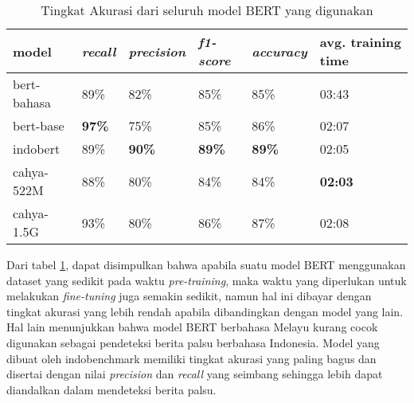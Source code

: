 \begin{table}[h]
    \centering
    \caption{Tingkat Akurasi dari seluruh model BERT yang digunakan}
    \label{tab:model_bert_result}
    \begin{tabular}{|l|l|l|l|l|p{.12\linewidth}|}
        \hline
        \textbf{model} & \textit{\textbf{recall}} & \textit{\textbf{precision}} & \textit{\textbf{f1-score}} & \textit{\textbf{accuracy}} & \textbf{avg. training time} \\ \hline
        bert-bahasa    & 89\%                     & 82\%                        & 85\%                       & 85\%                       & 03:43                       \\ \hline
        bert-base      & \textbf{97\%}            & 75\%                        & 85\%                       & 86\%                       & 02:07                       \\ \hline
        indobert       & 89\%                     & \textbf{90\%}               & \textbf{89\%}              & \textbf{89\%}              & 02:05                       \\ \hline
        cahya-522M     & 88\%                     & 80\%                        & 84\%                       & 84\%                       & \textbf{02:03}              \\ \hline
        cahya-1.5G     & 93\%                     & 80\%                        & 86\%                       & 87\%                       & 02:08                       \\ \hline
    \end{tabular}
\end{table}

Dari tabel \ref{tab:model_bert_result}, dapat disimpulkan bahwa apabila suatu model BERT menggunakan dataset yang sedikit pada waktu \textit{pre-training}, maka waktu yang diperlukan untuk melakukan \textit{fine-tuning} juga semakin sedikit, namun hal ini dibayar dengan tingkat akurasi yang lebih rendah apabila dibandingkan dengan model yang lain. Hal lain menunjukkan bahwa model BERT berbahasa Melayu kurang cocok digunakan sebagai pendeteksi berita palsu berbahasa Indonesia. Model yang dibuat oleh indobenchmark memiliki tingkat akurasi yang paling bagus dan disertai dengan nilai \textit{precision} dan \textit{recall} yang seimbang sehingga lebih dapat diandalkan dalam mendeteksi berita palsu.
